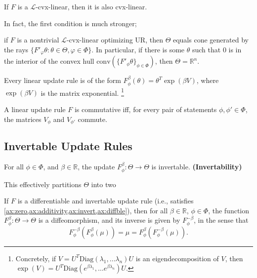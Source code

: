 \documentclass{article}
\begin{document}
\begin{prop}
    If $F$ is a $\mathcal L$-cvx-linear, then it is also cvx-linear.
\end{prop}

In fact, the first condition is much stronger;
\begin{prop}
    if $F$ is a nontrivial $\mathcal L$-cvx-linear optimizing UR, then $\Theta$ equals cone generated by  the rays $\{ F'_\varphi\theta : \theta \in \Theta, \varphi \in \Phi \}$. In particular, if there is some $\theta$ such that $0$ is in the interior of the convex hull $\mathrm{conv}(\{F'_\phi\theta\}_{\phi \in \Phi})$, then $\Theta = \mathbb R^n$.
\end{prop}


\begin{prop}
    Every linear update rule is of the form
    $
        F^{\beta}_\phi(\theta) =  \theta^{T} \exp(\beta V)
    $,
    where $\exp(\beta V)$ is the matrix exponential.%
        \footnote{Concretely, if $V = U^T \mathrm{Diag}(\lambda_1, \ldots \lambda_n) U$ is an eigendecomposition of $V$, then $\exp(V) = U^T \mathrm{Diag}(e^{\beta\lambda_1}, \ldots e^{\beta\lambda_n}) U$.}
\end{prop}

\begin{prop}
    A linear update rule $F$ is commutative iff, for every pair of statements  $\phi, \phi' \in \Phi$, the
    matrices $V_\phi$ and $V_{\phi'}$ commute.
\end{prop}



\subsection{Invertable Update Rules}
\begin{CFaxioms}
    \item For all $\phi\in\Phi$, and $\beta \in \mathbb R$, the update
    $F^{\beta}_{\phi}: \Theta \to \Theta$ is invertable.
    \hfill\textbf{(Invertability)} \label{ax:invert}
\end{CFaxioms}


This effectively partitions $\Theta$ into two


\begin{prop}
    If $F$ is a differentiable and invertable update rule (i.e., satisfies \cref{ax:zero,ax:additivity,ax:invert,ax:diffble}), then for all $\beta \in \mathbb R$, $\phi \in \Phi$, the function
    $F^\beta_\phi : \Theta \to \Theta$
    is a diffeomorphism, and its inverse is given by $F^{-\beta}_\phi$, in the sense that
    \[
        F^{-\beta}_\phi( F^{\beta}_\phi (\mu) ) = \mu = F^{\beta}_\phi( F^{-\beta}_\phi (\mu) ).
     \]
\end{prop}
\end{document}
